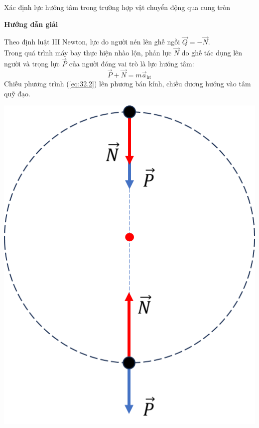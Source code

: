 \begin{dang}{Xác định lực hướng tâm trong trường hợp vật chuyển động qua cung tròn}
{	}
	{	\begin{center}
			\textbf{Hướng dẫn giải}
		\end{center}
	\begin{minipage}[l]{0.65\textwidth}
		Theo định luật III Newton, lực do người nén lên ghế ngồi $\vec Q=-\vec N$.\\
		Trong quá trình máy bay thực hiện nhào lộn, phản lực  $\vec N$ do ghế tác dụng lên người và trọng lực  $\vec P$ của người đóng vai trò là lực hướng tâm:
		\begin{equation}
			\label{eq:32.2}
			\vec P+\vec N=m\vec a_\text{ht}
		\end{equation}
		Chiếu phương trình (\ref{eq:32.2}) lên phương bán kính, chiều dương hướng vào tâm quỹ đạo.
	\end{minipage}
	\begin{minipage}[l]{0.3\textwidth}
		\begin{center}
			\includegraphics[width=0.7\linewidth]{../figs/VN10-2023-PH-TP032-2}

\end{center}
\end{minipage}}
\end{dang}
